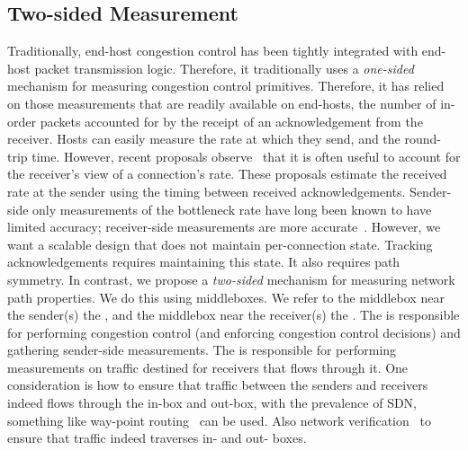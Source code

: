 \subsection{Two-sided Measurement}\label{s:design:twosided}
\begin{outline}
\1 Traditionally, end-host congestion control has been tightly integrated with end-host packet transmission logic.
    \1 Therefore, it traditionally uses a \emph{one-sided} mechanism for measuring congestion control primitives.
    \2 Therefore, it has relied on those measurements that are readily available on end-hosts, \ie the number of in-order packets accounted for by the receipt of an acknowledgement from the receiver.
    \2 Hosts can easily measure the rate at which they send, and the round-trip time.
    \2 However, recent proposals observe~\cite{bbr, sprout, remy, nimbus} that it is often useful to account for the receiver's view of a connection's rate.
        \3 These proposals estimate the received rate at the sender using the timing between received acknowledgements.
        \3 Sender-side only measurements of the bottleneck rate have long been known to have limited accuracy; receiver-side measurements are more accurate~\cite{packet-dynamics, path-properties}.
\1 However, we want a scalable design that does not maintain per-connection state. 
    \2 Tracking acknowledgements requires maintaining this state.
    \2 It also requires path symmetry.
\1 In contrast, we propose a \emph{two-sided} mechanism for measuring network path properties.
    \2 We do this using middleboxes.
    \2 We refer to the middlebox near the sender(s) the \emph{\inbox}, and the middlebox near the receiver(s) the \emph{\outbox}.
    \2 The \inbox is responsible for performing congestion control (and enforcing congestion control decisions) and gathering sender-side measurements.
    \2 The \outbox is responsible for performing measurements on traffic destined for receivers that flows through it.
    \2 One consideration is how to ensure that traffic between the senders and receivers indeed flows through the in-box and out-box, with the prevalence of SDN, something like way-point routing~\cite{waypoint-routing, flowtags} can be used. 
    \2 Also network verification~\cite{veriflow, anteater, reachability} to ensure that traffic indeed traverses in- and out- boxes.
\end{outline}

